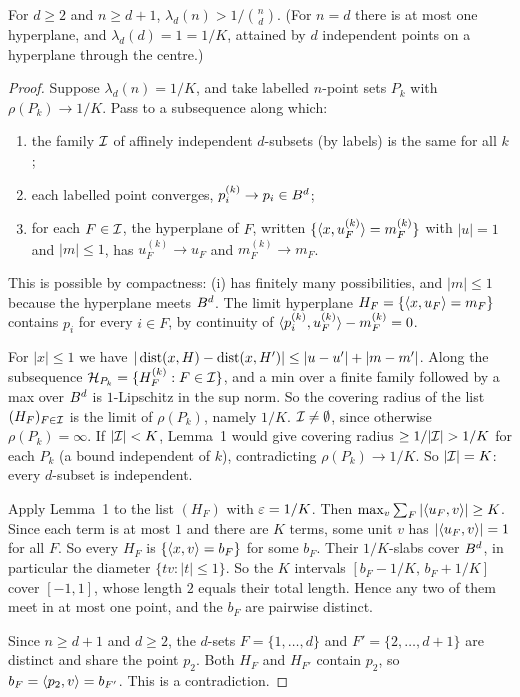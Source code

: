 \begin{proposition}\label{prop:A-strict}
For $d \ge 2$ and $n \ge d + 1$, $\lambda_d(n) > 1/\binom{n}{d}$. (For $n = d$ there is at most one
hyperplane, and $\lambda_d(d) = 1 = 1/K$, attained by $d$ independent points on a hyperplane
through the centre.)
\end{proposition}

\begin{proof}
Suppose $\lambda_d(n) = 1/K$, and take labelled $n$-point sets $P_k$ with $\rho(P_k) \to 1/K$.
Pass to a subsequence along which:
\begin{enumerate}[label=(\roman*)]
  \item the family $\mathcal{I}$ of affinely independent $d$-subsets (by labels) is the same for all $k$;
  \item each labelled point converges, $p_i^{(k)} \to p_i \in B^d$;
  \item for each $F \in \mathcal{I}$, the hyperplane of $F$, written
    $\{\langle x,u_F^{(k)}\rangle = m_F^{(k)}\}$ with $|u| = 1$ and $|m| \le 1$, has $u_F^{(k)} \to u_F$
    and $m_F^{(k)} \to m_F$.
\end{enumerate}
This is possible by compactness: (i) has finitely many possibilities, and $|m| \le 1$ because the
hyperplane meets $B^d$. The limit hyperplane $H_F = \{\langle x,u_F\rangle = m_F\}$ contains $p_i$ for
every $i \in F$, by continuity of $\langle p_i^{(k)},u_F^{(k)}\rangle - m_F^{(k)} = 0$.

For $|x| \le 1$ we have $|\operatorname{dist}(x, H) - \operatorname{dist}(x, H')| \le |u - u'| + |m - m'|$. Along the
subsequence $\mathcal{H}_{P_k} = \{H_F^{(k)} : F \in \mathcal{I}\}$, and a min over a finite family followed by a
max over $B^d$ is $1$-Lipschitz in the sup norm. So the covering radius of the list
$(H_F)_{F \in \mathcal{I}}$ is the limit of $\rho(P_k)$, namely $1/K$. $\mathcal{I} \ne \emptyset$, since
otherwise $\rho(P_k) = \infty$. If $|\mathcal{I}| < K$, Lemma~1 would give covering radius
$\ge 1/|\mathcal{I}| > 1/K$ for each $P_k$ (a bound independent of $k$), contradicting
$\rho(P_k) \to 1/K$. So $|\mathcal{I}| = K$: every $d$-subset is independent.

Apply Lemma~1 to the list $(H_F)$ with $\varepsilon = 1/K$. Then
$\max_v \sum_F |\langle u_F,v\rangle| \ge K$. Since each term is at most $1$ and there are $K$ terms, some
unit $v$ has $|\langle u_F,v\rangle| = 1$ for all $F$. So every $H_F$ is $\{\langle x,v\rangle = b_F\}$ for some
$b_F$. Their $1/K$-slabs cover $B^d$, in particular the diameter $\{tv : |t| \le 1\}$. So the
$K$ intervals $[b_F - 1/K,\, b_F + 1/K]$ cover $[-1, 1]$, whose length $2$ equals their total
length. Hence any two of them meet in at most one point, and the $b_F$ are pairwise distinct.

Since $n \ge d + 1$ and $d \ge 2$, the $d$-sets $F = \{1, \dots, d\}$ and
$F' = \{2, \dots, d+1\}$ are distinct and share the point $p_2$. Both $H_F$ and $H_{F'}$ contain
$p_2$, so $b_F = \langle p_2,v\rangle = b_{F'}$. This is a contradiction.
\end{proof}

